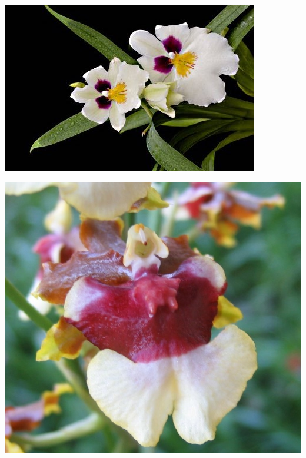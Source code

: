 \documentclass{article}
\begin{document}
\begin{center}
\includegraphics[height=0.925\paperheight]{../Orchid_Miltonia3.jpg}
\end{center}
\newpage

\begin{center}
\includegraphics[height=0.925\paperheight]{../Orchid_Oncidium.jpg}
\end{center}
\newpage
\end{document}
